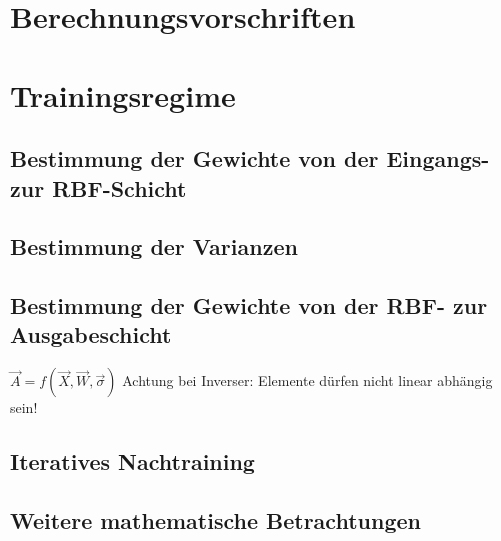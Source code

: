 \section{Berechnungsvorschriften}
\section{Trainingsregime}

\subsection{Bestimmung der Gewichte von der Eingangs- zur RBF-Schicht}

\subsection{Bestimmung der Varianzen}

\subsection{Bestimmung der Gewichte von der RBF- zur Ausgabeschicht}
$\vec{A}=f(\vec{X}, \vec{W}, \vec{\sigma})$
Achtung bei Inverser: Elemente dürfen nicht linear abhängig sein!

\subsection{Iteratives Nachtraining}

\subsection{Weitere mathematische Betrachtungen}






